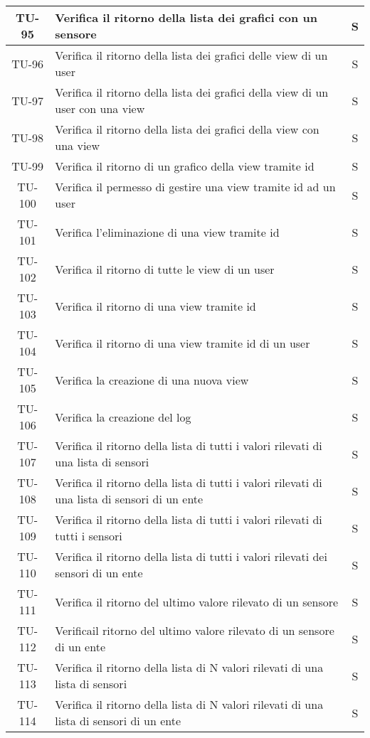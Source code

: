 \begin{center}
\begin{longtable}{|c|p{12cm}|c|}
			\hline
			TU-95 & Verifica il ritorno della lista dei grafici con un sensore & S \\
			\hline
			TU-96 & Verifica il ritorno della lista dei grafici delle view di un user & S \\
			\hline
			TU-97 & Verifica il ritorno della lista dei grafici della view di un user con una view & S \\
			\hline
			TU-98 & Verifica il ritorno della lista dei grafici della view con una view & S \\
			\hline
			TU-99 & Verifica il ritorno di un grafico della view tramite id & S \\
			\hline
			TU-100 & Verifica il permesso di gestire una view tramite id ad un user & S \\
			\hline
			TU-101 & Verifica l'eliminazione di una view tramite id & S \\
			\hline
			TU-102 & Verifica il ritorno di tutte le view di un user & S \\
			\hline
			TU-103 & Verifica il ritorno di una view tramite id & S \\
			\hline
			TU-104 & Verifica il ritorno di una view tramite id di un user & S \\
			\hline
			TU-105 & Verifica la creazione di una nuova view & S \\
			\hline
			TU-106 & Verifica la creazione del log & S \\
			\hline
			TU-107 & Verifica il ritorno della lista di tutti i valori rilevati di una lista di sensori & S \\
			\hline
			TU-108 & Verifica il ritorno della lista di tutti i valori rilevati di una lista di sensori di un ente & S \\
			\hline
			TU-109 & Verifica il ritorno della lista di tutti i valori rilevati di tutti i sensori & S \\
			\hline
			TU-110 & Verifica il ritorno della lista di tutti i valori rilevati dei sensori di un ente & S \\
			\hline
			TU-111 & Verifica il ritorno del ultimo valore rilevato di un sensore & S \\
			\hline
			TU-112 & Verificail ritorno del ultimo valore rilevato di un sensore di un ente & S \\
			\hline
			TU-113 & Verifica il ritorno della lista di N valori rilevati di una lista di sensori & S \\
			\hline
			TU-114 & Verifica il ritorno della lista di N valori rilevati di una lista di sensori di un ente & S \\

\end{longtable}
\end{center}
